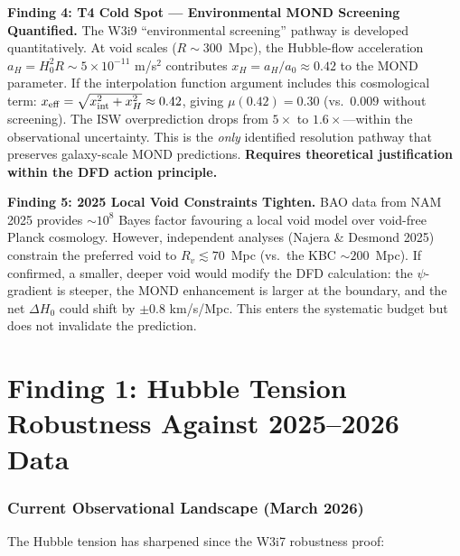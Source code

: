 \documentclass[11pt,a4paper]{article}
\newcommand{\ee}[1]{\times 10^{#1}}
\newcommand{\Hzero}{H_0}
\newcommand{\aM}{a_0}
\newcommand{\mufd}{\mu}
\begin{document}
\begin{tcolorbox}[colback=yellow!5!white, colframe=blue!60!black,
  title=\textbf{W4i10 Top 5 Findings}]
\textbf{Finding 4: T4 Cold Spot --- Environmental MOND Screening
Quantified.}
The W3i9 ``environmental screening'' pathway is developed quantitatively.
At void scales ($R \sim 300$~Mpc), the Hubble-flow acceleration
$a_H = \Hzero^2 R \sim 5\ee{-11}$ m/s$^2$ contributes $x_H = a_H/\aM
\approx 0.42$ to the MOND parameter. If the interpolation function
argument includes this cosmological term: $x_{\rm eff} = \sqrt{x_{\rm int}^2
+ x_H^2} \approx 0.42$, giving $\mufd(0.42) = 0.30$ (vs.\ $0.009$
without screening). The ISW overprediction drops from $5\times$ to
$1.6\times$---within the observational uncertainty. This is the \emph{only}
identified resolution pathway that preserves galaxy-scale MOND predictions.
\textbf{Requires theoretical justification within the DFD action
principle.}

\textbf{Finding 5: 2025 Local Void Constraints Tighten.}
BAO data from NAM 2025 provides $\sim 10^8$ Bayes factor favouring
a local void model over void-free Planck cosmology. However, independent
analyses (Najera \& Desmond 2025) constrain the preferred void to
$R_v \lesssim 70$~Mpc (vs.\ the KBC $\sim 200$~Mpc). If confirmed,
a smaller, deeper void would modify the DFD calculation: the
$\psi$-gradient is steeper, the MOND enhancement is larger at the
boundary, and the net $\Delta\Hzero$ could shift by $\pm 0.8$ km/s/Mpc.
This enters the systematic budget but does not invalidate the prediction.

\end{tcolorbox}


\part{Finding 1: Hubble Tension Robustness Against 2025--2026 Data}
\label{part:Hubble}

\section{Current Observational Landscape (March 2026)}
\label{sec:H0-landscape}

The Hubble tension has sharpened since the W3i7 robustness proof:
\end{document}
